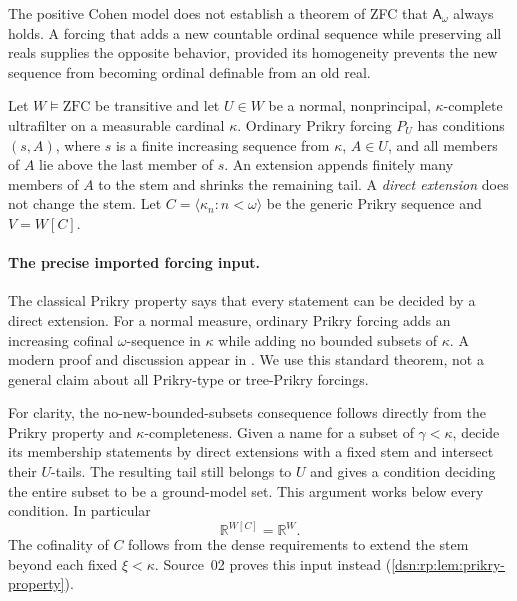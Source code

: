 \documentclass[11pt,a4paper]{article}
\numberwithin{equation}{section}
\theoremstyle{definition}
\theoremstyle{remark}
\newcommand{\R}{\mathbb R}
\newcommand{\Asm}{\mathsf A_{\omega}}
\newcommand{\seq}[1]{\langle #1\rangle}
\begin{document}
The positive Cohen model does not establish a theorem of ZFC that
$\Asm$ always holds. A forcing that adds a new countable ordinal
sequence while preserving all reals supplies the opposite behavior,
provided its homogeneity prevents the new sequence from becoming
ordinal definable from an old real.

Let $W\models\mathrm{ZFC}$ be transitive and let $U\in W$ be a normal,
nonprincipal, $\kappa$-complete ultrafilter on a measurable cardinal
$\kappa$. Ordinary Prikry forcing $P_U$ has conditions $(s,A)$, where
$s$ is a finite increasing sequence from $\kappa$, $A\in U$, and all
members of $A$ lie above the last member of $s$. An extension appends
finitely many members of $A$ to the stem and shrinks the remaining
tail. A \emph{direct extension} does not change the stem.
Let $C=\seq{\kappa_n:n<\omega}$ be the generic Prikry sequence and
$V=W[C]$.

\paragraph{The precise imported forcing input.}
The classical Prikry property says that every statement can be decided
by a direct extension. For a normal measure, ordinary Prikry forcing
adds an increasing cofinal $\omega$-sequence in $\kappa$ while adding
no bounded subsets of $\kappa$. A modern proof and discussion appear
in \cite{Benhamou}. We use this standard theorem, not a general claim
about all Prikry-type or tree-Prikry forcings.

For clarity, the no-new-bounded-subsets consequence follows directly
from the Prikry property and $\kappa$-completeness. Given a name for a
subset of $\gamma<\kappa$, decide its membership statements by direct
extensions with a fixed stem and intersect their $U$-tails. The resulting
tail still belongs to $U$ and gives a condition deciding the entire
subset to be a ground-model set. This argument works below every
condition. In particular
\begin{equation}\label{dsn:ca:eq:samereals}
 \R^{W[C]}=\R^W.
\end{equation}
The cofinality of $C$ follows from the dense requirements to extend the
stem beyond each fixed $\xi<\kappa$.
Source~02 proves this input instead (\cref{dsn:rp:lem:prikry-property}).
\end{document}
